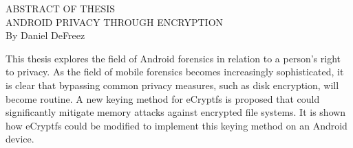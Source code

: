 \singlespacing
\begin{center}
ABSTRACT OF THESIS \\[1.0in]
ANDROID PRIVACY THROUGH ENCRYPTION \\[0.25in]
By Daniel DeFreez \\[1.25in]
\end{center}

\noindent
This thesis explores the field of Android forensics in relation to a person's right to privacy. As the field of mobile forensics
becomes increasingly sophisticated, it is clear that bypassing common privacy measures, such as disk encryption, will become
routine.  A new keying method for eCryptfs is proposed that could significantly mitigate memory attacks against encrypted file
systems. It is shown how eCryptfs could be modified to implement this keying method on an Android device.
\restoregeometry
